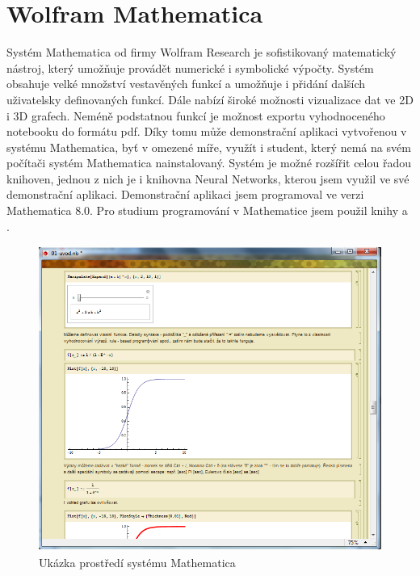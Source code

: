 \documentclass[11pt,twoside,a4paper]{book}
\begin{document}
\section{Wolfram Mathematica}
Systém Mathematica od firmy Wolfram Research je sofistikovaný matematický nástroj, který umožňuje provádět numerické i symbolické výpočty. Systém obsahuje velké množství vestavěných funkcí a umožňuje i přidání dalších uživatelsky definovaných funkcí. Dále nabízí široké možnosti vizualizace dat ve 2D i 3D grafech. Neméně podstatnou funkcí je možnost exportu vyhodnoceného notebooku do formátu pdf. Díky tomu může demonstrační aplikaci vytvořenou v systému Mathematica, byť v omezené míře, využít i student, který nemá na svém počítači systém Mathematica nainstalovaný. Systém je možné rozšířit celou řadou knihoven, jednou z nich je i knihovna Neural Networks, kterou jsem využil ve své demonstrační aplikaci. Demonstrační aplikaci jsem programoval ve verzi Mathematica 8.0. Pro studium programování v Mathematice jsem použil knihy\cite{mathD} a \cite{mathP}.

\begin{figure}[!h]
\begin{center}
\includegraphics[height=10cm]{figures/ukazka01.png}
\caption{Ukázka prostředí systému Mathematica}
\label{fig:prostredi}
\end{center}
\end{figure}
\end{document}
